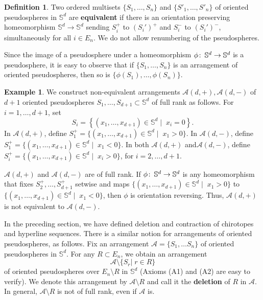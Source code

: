 \documentclass[a4paper]{amsart}
\def\co{\colon\thinspace}
\newcommand{\begriff}[1]{\textbf{#1}}
\newcommand{\p}{\mathbb S}
\theoremstyle{definition}
\newtheorem{definition}{Definition}
\newtheorem{example}{Example}
\theoremstyle{remark}
\begin{document}
\begin{definition}
  Two ordered multisets $\{S_1,\dots,S_n\}$ and $\{S'_1,\dots, S'_n\}$ of
  oriented pseu\-do\-sphe\-res in $\p^d$  are \begriff{equivalent} if
  there is an orientation preserving homeomorphism $\p^d\to\p^d$ sending
  $S_i^+$ to $(S_i')^+$ and $S_i^-$ to $(S_i')^-$, simultaneously 
  for all $i\in E_n$. 
  We do not allow renumbering of the pseudospheres. 
\end{definition}
Since the image of a pseudosphere under a homeomorphism $\phi\co \p^d \to
\p^d$ is a pseudosphere, it is easy to observe that if $\{S_1,\dots,
S_n\}$  is an arrangement of oriented pseudospheres, then so is
$\{\phi(S_1),\dots, \phi(S_n)\}$.

\begin{example}  
We construct non-equivalent arrangements $\mathcal A(d,+),
  \mathcal A(d,-)$ of $d+1$ oriented pseudo\-spheres
$S_1,\dots,S_{d+1}\subset \p^d$  of full rank as follows.
  For $i=1,\dots, d+1$, set
  $$ S_i = \left\{ (x_1,\dots,x_{d+1})\in \p^d\;|\;\; x_i=  0\right\}.$$
  In   $\mathcal A(d,+)$, define $S_1^+ = 
  \big\{ (x_1,\dots,x_{d+1})\in \p^d\;|\;\; x_1>  0\big\}$. In
  $\mathcal A(d,-)$, define $S_1^+ = \big\{ (x_1,\dots,x_{d+1})\in
    \p^d\;|\;\; x_1 <  0\big\}$. In both $\mathcal A(d,+)$
  and$\mathcal A(d,-)$,  define  
  $S_i^+ =\big\{ (x_1,\dots,x_{d+1})\in \p^d\;|\;\; x_i >  0\big\}$, for
  $i=2,\dots,d+1$. 

  $\mathcal A(d,+)$ and $ \mathcal A(d,-)$ are of full
  rank. If $\phi\co\p^d\to\p^d$ is any homeomorphism that fixes
  $S_2^+,\dots,S_{d+1}^+$ setwise and maps  $\big\{
    (x_1,\dots,x_{d+1})\in \p^d\;|\;\; x_1>  0\big\}$ to $\big\{
    (x_1,\dots,x_{d+1})\in \p^d\;|\;\; x_1<  0\big\}$, then $\phi$ is
  orientation reversing. Thus, $\mathcal A(d,+)$ is not equivalent to
  $\mathcal A(d,-)$. 
\end{example}

In the preceding section, we have defined deletion and contraction of
chirotopes and hyperline sequences. There is a similar notion for
arrangements of oriented pseudospheres, as follows.
Fix an arrangement $\mathcal A = \{S_1,\dots S_n\}$  of oriented
pseudospheres in $\p^d$. 
%
For any $R \subset E_n$, we obtain an arrangement $$\mathcal
A\setminus \big\{S_{r} |\; r\in R\big\}$$ of oriented pseudospheres over
$E_n\setminus R$ in $\p^d$ (Axioms (A1) and (A2) are easy to verify). We
denote this arrangement by $\mathcal A\setminus R$ and call 
it the \begriff{deletion} of $R$ in $\mathcal A$. In general,
$\mathcal A\setminus R$ is not of full rank, even if $\mathcal A$ is.
\end{document}

